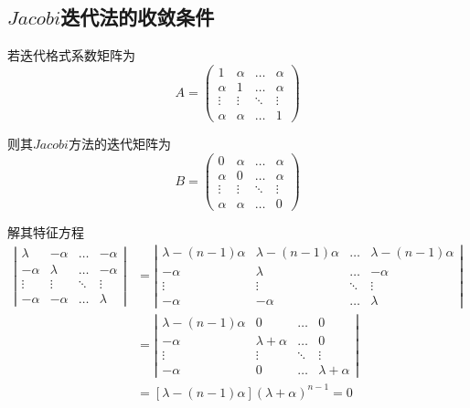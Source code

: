 \documentclass{article}
\begin{document}
\begin{CJK*}{UTF8}{gbsn}

\section{$Jacobi$迭代法的收敛条件}
若迭代格式系数矩阵为
\[
A = 
\left(
\begin{array}{cccc}
1 & \alpha & \ldots & \alpha \\
\alpha & 1 & \ldots & \alpha \\
\vdots & \vdots & \ddots & \vdots \\
\alpha & \alpha & \ldots & 1
\end{array}
\right)
\]

则其$Jacobi$方法的迭代矩阵为
\[
B = 
\left(
\begin{array}{cccc}
0 & \alpha & \ldots & \alpha \\
\alpha & 0 & \ldots & \alpha \\
\vdots & \vdots & \ddots & \vdots \\
\alpha & \alpha & \ldots & 0
\end{array}
\right)
\]

解其特征方程
\[
\begin{aligned}
\left|
\begin{array}{cccc}
\lambda & -\alpha & \ldots & -\alpha \\
-\alpha & \lambda & \ldots & -\alpha \\
\vdots & \vdots & \ddots & \vdots \\
-\alpha & -\alpha & \ldots & \lambda
\end{array}
\right|
&=
\left|
\begin{array}{cccc}
\lambda - (n - 1)\alpha & \lambda - (n - 1)\alpha & \ldots & \lambda - (n - 1)\alpha \\
-\alpha & \lambda & \ldots & -\alpha \\
\vdots & \vdots & \ddots & \vdots \\
-\alpha & -\alpha & \ldots & \lambda
\end{array}
\right| \\
&=
\left|
\begin{array}{cccc}
\lambda - (n - 1)\alpha & 0 & \ldots & 0 \\
-\alpha & \lambda + \alpha & \ldots & 0 \\
\vdots & \vdots & \ddots & \vdots \\
-\alpha & 0 & \ldots & \lambda + \alpha
\end{array}
\right| \\
&= [\lambda - (n - 1)\alpha](\lambda + \alpha)^{n - 1} = 0
\end{aligned}
\]


\end{CJK*}
\end{document}
